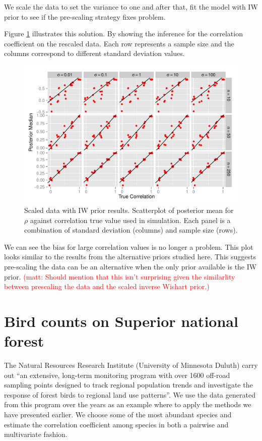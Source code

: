 \documentclass[a4paper]{article}
\newcommand{\matt}[1]{\textcolor{red}{(matt: #1)}}
\begin{document}
We scale the data to set the variance to one and after that, fit the model with IW prior to see if the pre-scaling strategy fixes problem. 

Figure \ref{sciw} illustrates this solution. By showing the inference for the correlation coefficient on the rescaled data. Each row represents a sample size and the columns correspond to different standard deviation values. 

\begin{figure}[htbp]
   \centering
   \includegraphics[width=\textwidth]{scIW} %
    \vspace{-.5in}
   \caption{Scaled data with IW prior results. Scatterplot of posterior mean for $\rho$  against correlation true value used in simulation. Each panel is a combination of standard deviation (columns) and sample size (rows). \label{sciw} }
\end{figure}

We can see the bias for large correlation values is no longer a problem. This plot looks similar to the results from the alternative priors studied here. This suggests pre-scaling the data can be an alternative when the only prior available is the IW prior. \matt{Should mention that this isn't surprising given the similarlity between prescaling the data and the scaled inverse Wishart prior.}


\section{Bird counts on Superior national forest}

The Natural Resources Research Institute (University of Minnesota Duluth) carry out ``an extensive, long-term monitoring program with over 1600 off-road sampling points designed to track regional population trends and investigate the response of forest birds to regional land use patterns''. We use the data generated from this program over the years as an example where to apply the methods we have presented earlier. We choose some of the most abundant species and estimate the correlation coefficient among species in both a pairwise and multivariate fashion. 
\end{document}
